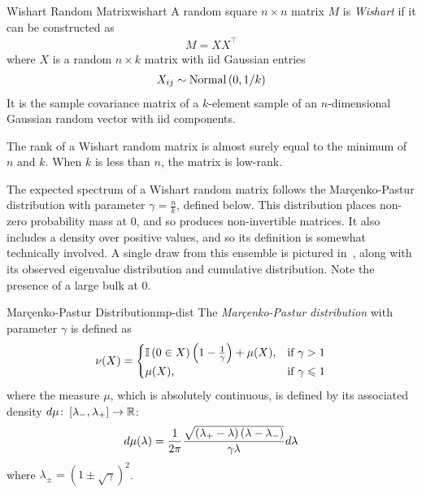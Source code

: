 \documentclass[../../thesis.tex]{subfiles}
\begin{document}
\begin{definition}{Wishart Random Matrix}{wishart}
	A random square $n\times n$ matrix $M$ is \emph{Wishart}
	if it can be constructed as
	\begin{align}
		M = XX^\top
	\end{align}
	where $X$ is a random $n \times k$ matrix with
	iid Gaussian entries
	\begin{align}
		X_{ij} \sim \mathrm{Normal}\left(0, 1/k\right)
	\end{align}
	It is the sample covariance matrix of a $k$-element sample
	of an $n$-dimensional Gaussian random vector with
	iid components.
\end{definition}
\noindent The rank of a Wishart random matrix is almost surely equal to
the minimum of $n$ and $k$.
When $k$ is less than $n$,
the matrix is low-rank.

The expected spectrum of a Wishart random matrix
follows the Mar{\c c}enko-Pastur distribution
with parameter $\gamma = \frac{n}{k}$,
defined below.
This distribution places non-zero probability mass at $0$,
and so produces non-invertible matrices.
It also includes a density over positive values,
and so its definition is somewhat technically involved.
A single draw from this ensemble is pictured
in~,
along with its observed eigenvalue distribution
and cumulative distribution.
Note the presence of a large bulk at $0$.

\begin{definition}{Mar{\c c}enko-Pastur Distribution}{mp-dist}
	The \emph{Mar{\c c}enko-Pastur distribution}
	with parameter $\gamma$ is defined as
	\begin{equation}\equationlabel{def-mp-dist}
		\nu(X) =
			\begin{cases}
				\Ind\left(0 \in X\right)%
					\left(1-\frac{1}{\gamma}\right) + \mu(X),
				& \text{if } \gamma > 1\\
				\mu(X),
				& \text{if } \gamma \leq 1\\
			\end{cases}
	\end{equation}
	where the measure $\mu$,
	which is absolutely continuous, is defined
	by its associated density
	$d\mu\colon\left[\lambda_-, \lambda_+\right]\to\mathbb{R}$:
	\begin{equation}\equationlabel{def-mp-density}
		d\mu(\lambda) = \frac{1}{2\pi}%
		\frac{\sqrt{\left(\lambda_+ - \lambda\right)\left(\lambda-\lambda_-\right)}}%
		{\gamma\lambda} d\lambda
	\end{equation}
	where $\lambda_{\pm} = {\left(1 \pm \sqrt{\gamma}\right)}^2$.
\end{definition}
\end{document}
